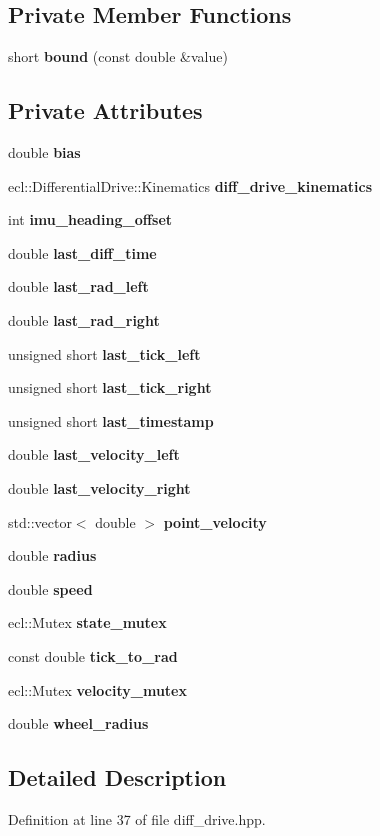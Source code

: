 \subsection*{\-Private \-Member \-Functions}
\begin{DoxyCompactItemize}
\item 
short {\bf bound} (const double \&value)
\end{DoxyCompactItemize}
\subsection*{\-Private \-Attributes}
\begin{DoxyCompactItemize}
\item 
double {\bf bias}
\item 
ecl\-::\-Differential\-Drive\-::\-Kinematics {\bf diff\-\_\-drive\-\_\-kinematics}
\item 
int {\bf imu\-\_\-heading\-\_\-offset}
\item 
double {\bf last\-\_\-diff\-\_\-time}
\item 
double {\bf last\-\_\-rad\-\_\-left}
\item 
double {\bf last\-\_\-rad\-\_\-right}
\item 
unsigned short {\bf last\-\_\-tick\-\_\-left}
\item 
unsigned short {\bf last\-\_\-tick\-\_\-right}
\item 
unsigned short {\bf last\-\_\-timestamp}
\item 
double {\bf last\-\_\-velocity\-\_\-left}
\item 
double {\bf last\-\_\-velocity\-\_\-right}
\item 
std\-::vector$<$ double $>$ {\bf point\-\_\-velocity}
\item 
double {\bf radius}
\item 
double {\bf speed}
\item 
ecl\-::\-Mutex {\bf state\-\_\-mutex}
\item 
const double {\bf tick\-\_\-to\-\_\-rad}
\item 
ecl\-::\-Mutex {\bf velocity\-\_\-mutex}
\item 
double {\bf wheel\-\_\-radius}
\end{DoxyCompactItemize}


\subsection{\-Detailed \-Description}


\-Definition at line 37 of file diff\-\_\-drive.\-hpp.



